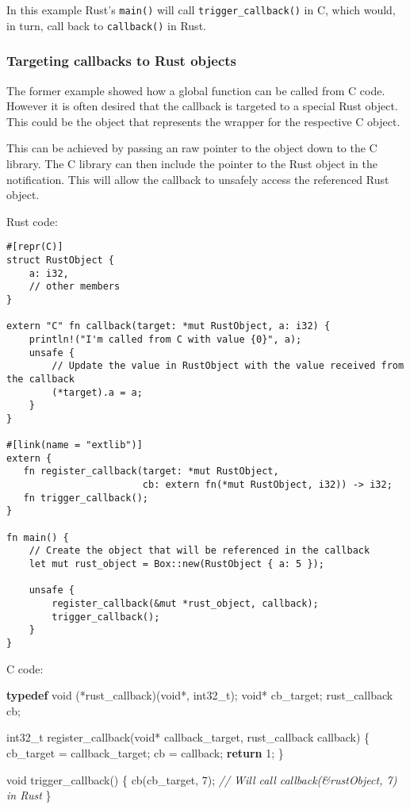 \documentclass[a4paper,]{book}
\newenvironment{Shaded}{\begin{snugshade}}{\end{snugshade}}
\newcommand{\KeywordTok}[1]{\textcolor[rgb]{0.13,0.29,0.53}{\textbf{{#1}}}}
\newcommand{\DataTypeTok}[1]{\textcolor[rgb]{0.13,0.29,0.53}{{#1}}}
\newcommand{\DecValTok}[1]{\textcolor[rgb]{0.00,0.00,0.81}{{#1}}}
\newcommand{\CommentTok}[1]{\textcolor[rgb]{0.56,0.35,0.01}{\textit{{#1}}}}
\newcommand{\NormalTok}[1]{{#1}}
\begin{document}
In this example Rust's \texttt{main()} will call
\texttt{trigger\_callback()} in C, which would, in turn, call back to
\texttt{callback()} in Rust.

\subsubsection{Targeting callbacks to Rust
objects}\label{targeting-callbacks-to-rust-objects}

The former example showed how a global function can be called from C
code. However it is often desired that the callback is targeted to a
special Rust object. This could be the object that represents the
wrapper for the respective C object.

This can be achieved by passing an raw pointer to the object down to the
C library. The C library can then include the pointer to the Rust object
in the notification. This will allow the callback to unsafely access the
referenced Rust object.

Rust code:

\begin{verbatim}
#[repr(C)]
struct RustObject {
    a: i32,
    // other members
}

extern "C" fn callback(target: *mut RustObject, a: i32) {
    println!("I'm called from C with value {0}", a);
    unsafe {
        // Update the value in RustObject with the value received from the callback
        (*target).a = a;
    }
}

#[link(name = "extlib")]
extern {
   fn register_callback(target: *mut RustObject,
                        cb: extern fn(*mut RustObject, i32)) -> i32;
   fn trigger_callback();
}

fn main() {
    // Create the object that will be referenced in the callback
    let mut rust_object = Box::new(RustObject { a: 5 });

    unsafe {
        register_callback(&mut *rust_object, callback);
        trigger_callback();
    }
}
\end{verbatim}

C code:

\begin{Shaded}
\begin{Highlighting}[]
\KeywordTok{typedef} \DataTypeTok{void} \NormalTok{(*rust_callback)(}\DataTypeTok{void}\NormalTok{*, }\DataTypeTok{int32_t}\NormalTok{);}
\DataTypeTok{void}\NormalTok{* cb_target;}
\NormalTok{rust_callback cb;}

\DataTypeTok{int32_t} \NormalTok{register_callback(}\DataTypeTok{void}\NormalTok{* callback_target, rust_callback callback) \{}
    \NormalTok{cb_target = callback_target;}
    \NormalTok{cb = callback;}
    \KeywordTok{return} \DecValTok{1}\NormalTok{;}
\NormalTok{\}}

\DataTypeTok{void} \NormalTok{trigger_callback() \{}
  \NormalTok{cb(cb_target, }\DecValTok{7}\NormalTok{); }\CommentTok{// Will call callback(&rustObject, 7) in Rust}
\NormalTok{\}}
\end{Highlighting}
\end{Shaded}
\end{document}
